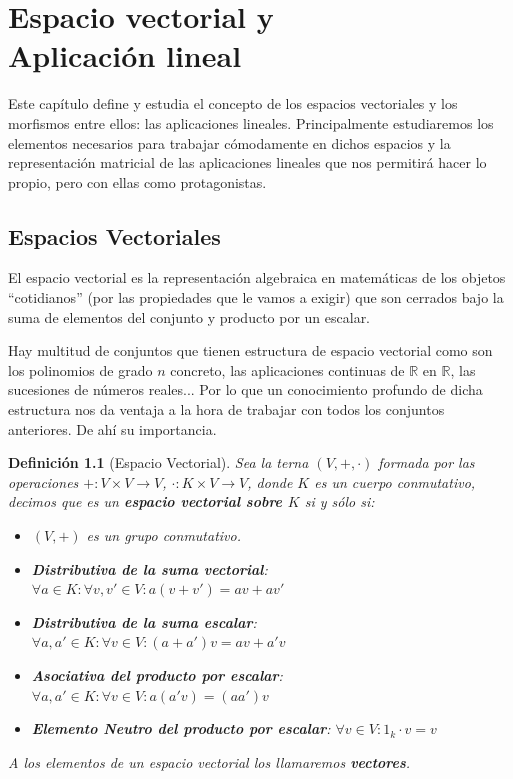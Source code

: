 \documentclass[10pt,a4paper,openright]{book}
\theoremstyle{break}
\newtheorem*{defi}{Definición}
\begin{document}
\mainmatter
\hypersetup{linkcolor=black} %
\setcounter{tocdepth}{3}%
\setcounter{secnumdepth}{4}%
\tableofcontents
\hypersetup{linkcolor=blue} %

\chapter{Espacio vectorial y \\ Aplicación lineal}
Este capítulo define y estudia el concepto de los espacios vectoriales y los morfismos entre ellos: las aplicaciones lineales. Principalmente estudiaremos los elementos necesarios para trabajar cómodamente en dichos espacios y la representación matricial de las aplicaciones lineales que nos permitirá hacer lo propio, pero con ellas como protagonistas.

\section{Espacios Vectoriales}
El espacio vectorial es la representación algebraica en matemáticas de los objetos ``cotidianos'' (por las propiedades que le vamos a exigir) que son cerrados bajo la suma de elementos del conjunto y producto por un escalar.

Hay multitud de conjuntos que tienen estructura de espacio vectorial como son los polinomios de grado $n$ concreto, las aplicaciones continuas de $\mathbb{R}$ en $\mathbb{R}$, las sucesiones de números reales... Por lo que un conocimiento profundo de dicha estructura nos da ventaja a la hora de trabajar con todos los conjuntos anteriores. De ahí su importancia.

\begin{defi}[Espacio Vectorial]
Sea la terna $(V,+,\cdot)$ formada por las operaciones $+: V\times V\rightarrow V$, $\cdot : K\times V\rightarrow V$, donde $K$ es un cuerpo conmutativo, decimos que es un \textbf{espacio vectorial sobre $K$} si y sólo si:
\begin{itemize}
\item $(V,+)$ es un grupo conmutativo.
\item \textbf{Distributiva de la suma vectorial}: $\forall a \in K: \forall v,v'\in V: a(v+v')=av+av'$
\item \textbf{Distributiva de la suma escalar}: $ \forall a,a' \in K: \forall v\in V: (a+a')v=av+a'v $
\item \textbf{Asociativa del producto por escalar}: $ \forall a,a'\in K: \forall v \in V: a(a'v)=(aa')v $
\item \textbf{Elemento Neutro del producto por escalar}: $ \forall v\in V: 1_k\cdot v=v
$
\end{itemize}
A los elementos de un espacio vectorial los llamaremos \textbf{vectores}.
\end{defi}
\end{document}
